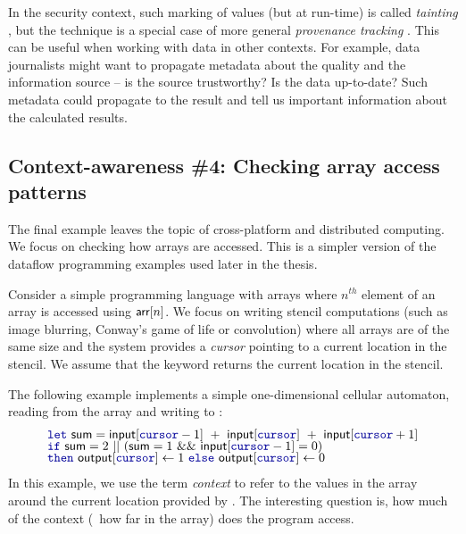 In the security context, such marking of values (but at run-time) is called \emph{tainting}
\cite{app-tainting-sql}, but the technique is a special case of more general \emph{provenance
tracking} \cite{app-provenance-future}. This can be useful when working with data in other contexts.
For example, data journalists might want to propagate metadata about the quality and the
information source -- is the source trustworthy? Is the data up-to-date? Such metadata could
propagate to the result and tell us important information about the calculated results.


\subsection{Context-awareness \#4: Checking array access patterns}
\label{sec:intro-why-array}

The final example leaves the topic of cross-platform and distributed computing. We focus on
checking how arrays are accessed. This is a simpler version of the dataflow programming
examples used later in the thesis.

Consider a simple programming language with arrays where $n^{\mathit{th}}$ element of an
array  is accessed using $\textnormal{\sffamily arr}[n]$. We focus on writing stencil computations
(such as image blurring, Conway's game of life or convolution) where all arrays are of
the same size and the system provides a \emph{cursor} pointing to a current location in the
stencil. We assume that the keyword  returns the current location in the stencil.

The following example implements a simple one-dimensional cellular automaton, reading from the
 array and writing to :
%
\begin{equation*}
\begin{array}{l}
\kvd{let}~\ident{sum}=\ident{input}[\kvd{cursor} - 1] ~+~ \ident{input}[\kvd{cursor}] ~+~ \ident{input}[\kvd{cursor} + 1]\\[-0.25em]
\kvd{if}~\ident{sum}=2 ~||~ (\ident{sum}=1 ~\&\&~ \ident{input}[\kvd{cursor} - 1] = 0)\\[-0.25em]
\kvd{then}~\ident{output}[\kvd{cursor}] \leftarrow 1 ~\kvd{else}~\ident{output}[\kvd{cursor}] \leftarrow 0
\end{array}
\end{equation*}
%
In this example, we use the term \emph{context} to refer to the values in the array around the
current location provided by . The interesting question is, how much of the context
(\ie~how far in the array) does the program access.

